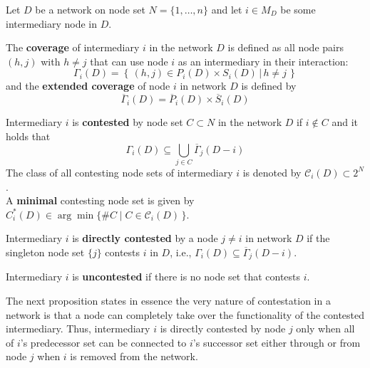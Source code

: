 \begin{definition} \label{Contested}
Let $D$ be a network on node set $N=\{1, \ldots ,n\}$ and let $i \in M_D$ be some intermediary node in $D$.
\begin{abet}
\item The \textbf{coverage} of intermediary $i$ in the network $D$ is defined as all node pairs $(h,j)$ with $h \neq j$ that can use node $i$ as an intermediary in their interaction:
\begin{equation} \label{eq:coverage}
	\Gamma_i (D) = \left\{ \left. \, (h,j) \in P_i (D) \times S_i (D) \, \right| \, h \neq j \, \right\}
\end{equation} \label{eq:extendedCoverage}
and the \textbf{extended coverage} of node $i$ in network $D$ is defined by
\begin{equation}
	\overline{\Gamma}_i (D) = \overline{P}_i (D) \times \overline{S}_i (D)
\end{equation}
\item Intermediary $i$ is \textbf{contested} by node set $C \subset N$ in the network $D$ if $i \notin C$ and it holds that
\begin{equation} \label{Group Contested}
\Gamma_i (D) \subseteq \bigcup_{j \in C} \overline{\Gamma}_j (D-i)
\end{equation}
The class of all contesting node sets of intermediary $i$ is denoted by $\mathcal{C}_i (D) \subset 2^N$.
\\
A \textbf{minimal} contesting node set is given by $C_{i}^{*}(D) \in \arg \min \{ \# C \mid C \in \mathcal{C}_{i} (D) \, \}$.

\item Intermediary $i$ is \textbf{directly contested} by a node $j \neq i$ in network $D$ if the singleton node set $\{ j \}$ contests $i$ in $D$, i.e., $\Gamma_i (D) \subseteq \overline{\Gamma}_j (D-i)$.

\item Intermediary $i$ is \textbf{uncontested} if there is no node set that contests $i$.
\end{abet}
\end{definition}

\noindent
The next proposition states in essence the very nature of contestation in a network is that a node can completely take over the functionality of the contested intermediary. Thus, intermediary $i$ is directly contested by node $j$ only when all of $i$'s predecessor set can be connected to $i$'s successor set either through or from node $j$ when $i$ is removed from the network.

